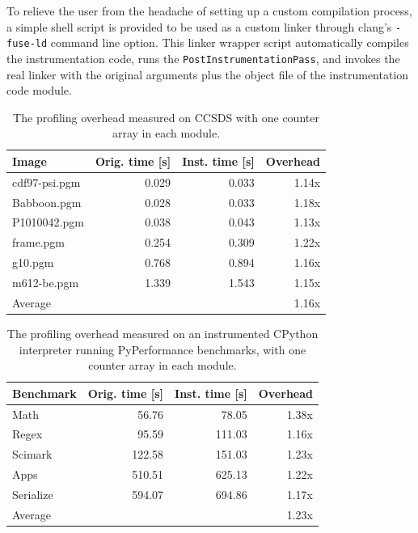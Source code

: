 To relieve the user from the headache of setting up a custom compilation process, a simple shell script is provided to be used as a custom linker through clang's \texttt{-fuse-ld} command line option. This linker wrapper script automatically compiles the instrumentation code, runs the \texttt{PostInstrumentationPass}, and invokes the real linker with the original arguments plus the object file of the instrumentation code module.

\begin{table}[]
    \centering
    \begin{tabular}{lrrr}
    \textbf{Image} & \textbf{Orig. time [s]} & \textbf{Inst. time [s]} & \textbf{Overhead}  \\ 
    \hline
    \hline
    cdf97-psi.pgm & 0.029 & 0.033 & 1.14x \\
    Babboon.pgm & 0.028 & 0.033 & 1.18x \\
    P1010042.pgm & 0.038 & 0.043 & 1.13x \\
    frame.pgm & 0.254 & 0.309 & 1.22x \\
    g10.pgm & 0.768 & 0.894 & 1.16x \\
    m612-be.pgm & 1.339 & 1.543 & 1.15x \\ \hline
    Average & & & 1.16x
    \end{tabular}
    \caption{The profiling overhead measured on CCSDS with one counter array in each module.}
    \label{tab:ccsds-multi-array}
\end{table}

\begin{table}[]
    \centering
    \begin{tabular}{lrrr}
    \textbf{Benchmark} & \textbf{Orig. time [s]} & \textbf{Inst. time [s]} & \textbf{Overhead}  \\ 
    \hline
    \hline
    Math & 56.76 & 78.05 & 1.38x \\
    Regex & 95.59 & 111.03 & 1.16x \\
    Scimark & 122.58 & 151.03 & 1.23x \\
    Apps & 510.51 & 625.13 & 1.22x \\
    Serialize & 594.07 & 694.86 & 1.17x \\ \hline
    Average & & & 1.23x
    \end{tabular}
    \caption{The profiling overhead measured on an instrumented CPython interpreter running PyPerformance benchmarks, with one counter array in each module.}
    \label{tab:cpython-multi-array}
\end{table}


